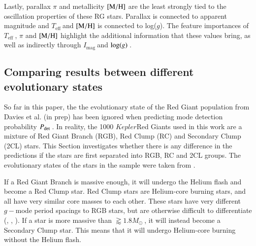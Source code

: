\documentclass[a4paper,fleqn,usenatbib,useAMS]{mnras}
\newcommand{\teff}{\ensuremath{T_{\textrm{eff}}\:}}
\newcommand{\kep}{\ensuremath{Kepler}\:}
\newcommand{\pdet}{\ensuremath{P_{\rm det}\:}}
\newcommand{\imag}{\ensuremath{I_{\textrm{mag}}\:}}
\newcommand{\msol}{\ensuremath{M_{\odot}\:}}
\newcommand{\logg}{\ensuremath{{\rm log}(g)\:}}
\begin{document}
Lastly, parallax $\pi$ and metallicity $\rm [M/H]$ are the least strongly tied to the oscillation properties of these RG stars. Parallax is connected to apparent magnitude and \teff and $\rm [M/H]$ is connected to log($g$). The feature importances of \teff, $\pi$ and $\rm [M/H]$ highlight the additional information that these values bring, as well as indirectly through \imag and \logg.

\subsection{Comparing results between different evolutionary states}
\label{sect: evo states}

So far in this paper, the the evolutionary state of the Red Giant population from Davies et al. (in prep) has been ignored when predicting mode detection probability \pdet. In reality, the 1000 \kep Red Giants used in this work are a mixture of Red Giant Branch (RGB), Red Clump (RC) and Secondary Clump (2CL) stars. This Section investigates whether there is any difference in the predictions if the stars are first separated into RGB, RC and 2CL groups. The evolutionary states of the stars in the sample were taken from \citet{elsworth_new_2017}. 

If a Red Giant Branch is massive enough, it will undergo the Helium flash and become a Red Clump star. Red Clump stars are Helium-core burning stars, and all have very similar core masses to each other. These stars have very different $g-$mode period spacings to RGB stars, but are otherwise difficult to differentiate (\citet{chaplin_asteroseismology_2013}, \citet{bedding_solar-like_2011}, \citet{beck_kepler_2011}). If a star is more massive than $\gtrapprox1.8\msol$, it will instead become a Secondary Clump star. This means that it will undergo Helium-core burning without the Helium flash.
\end{document}

